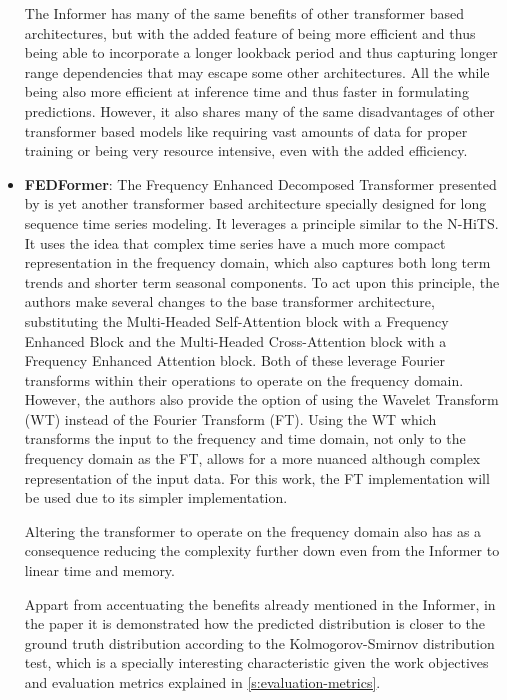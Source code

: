 \begin{itemize}
    The Informer has many of the same benefits of other transformer based architectures, but with the added feature of being more efficient and thus being able to incorporate a longer lookback period and thus capturing longer range dependencies that may escape some other architectures. All the while being also more efficient at inference time and thus faster in formulating predictions. However, it also shares many of the same disadvantages of other transformer based models like requiring vast amounts of data for proper training or being very resource intensive, even with the added efficiency.  
    \item \textbf{FEDFormer}: The Frequency Enhanced Decomposed Transformer presented by \cite{zhou_ma_wen_wang_sun_jin_2022} is yet another transformer based architecture specially designed for long sequence time series modeling. It leverages a principle similar to the N-HiTS. It uses the idea that complex time series have a much more compact representation in the frequency domain, which also captures both long term trends and shorter term seasonal components. To act upon this principle, the authors make several changes to the base transformer architecture, substituting the Multi-Headed Self-Attention block with a Frequency Enhanced Block and the Multi-Headed Cross-Attention block with a Frequency Enhanced Attention block. Both of these leverage Fourier transforms within their operations to operate on the frequency domain. However, the authors also provide the option of using the Wavelet Transform (WT) instead of the Fourier Transform (FT). Using the WT which transforms the input to the frequency and time domain, not only to the frequency domain as the FT, allows for a more nuanced although complex representation of the input data. For this work, the FT implementation will be used due to its simpler implementation. 
    
    Altering the transformer to operate on the frequency domain also has as a consequence reducing the complexity further down even from the Informer to linear time and memory. 
    
    Appart from accentuating the benefits already mentioned in the Informer, in the paper it is demonstrated how the predicted distribution is closer to the ground truth distribution according to the Kolmogorov-Smirnov distribution test, which is a specially interesting characteristic given the work objectives and evaluation metrics explained in \autoref{s:evaluation-metrics}.


\end{itemize}
